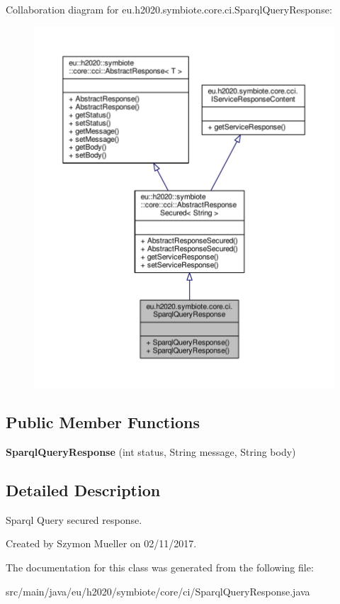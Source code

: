 Collaboration diagram for eu.\+h2020.\+symbiote.\+core.\+ci.\+Sparql\+Query\+Response\+:
\nopagebreak
\begin{figure}[H]
\begin{center}
\leavevmode
\includegraphics[width=350pt]{classeu_1_1h2020_1_1symbiote_1_1core_1_1ci_1_1SparqlQueryResponse__coll__graph}
\end{center}
\end{figure}
\subsection*{Public Member Functions}
\begin{DoxyCompactItemize}
\item 
\mbox{\label{classeu_1_1h2020_1_1symbiote_1_1core_1_1ci_1_1SparqlQueryResponse_a1fe0bf88d7c93ac85d2ce0459ba6eec0}} 
{\bfseries Sparql\+Query\+Response} (int status, String message, String body)
\end{DoxyCompactItemize}


\subsection{Detailed Description}
Sparql Query secured response.

Created by Szymon Mueller on 02/11/2017. 

The documentation for this class was generated from the following file\+:\begin{DoxyCompactItemize}
\item 
src/main/java/eu/h2020/symbiote/core/ci/Sparql\+Query\+Response.\+java\end{DoxyCompactItemize}
